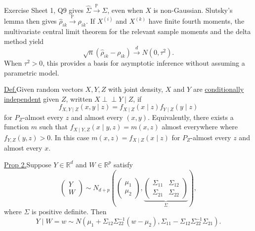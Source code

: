 \documentclass[11pt,a4paper]{article}
\begin{document}
Exercise Sheet 1, Q9 gives $\hat\Sigma\xrightarrow{\mathbb P}\Sigma$,
even when $X$ is non-Gaussian. Slutsky's lemma then gives
$\hat\rho_{ik}\xrightarrow{\mathbb P}\rho_{ik}$.
If $X^{(i)}$ and $X^{(k)}$ have finite fourth moments, the multivariate
central limit theorem for the relevant sample moments and the delta
method yield
\[
\sqrt n(\hat\rho_{ik}-\rho_{ik})\xrightarrow{d}N(0,\tau^2).
\]
When $\tau^2>0$, this provides a basis for asymptotic inference without
assuming a parametric model.

\medskip
\noindent\underline{Def.}\quad Given random vectors $X,Y,Z$ with
joint density, $X$ and $Y$ are \underline{conditionally independent}
given $Z$, written $X\perp\!\!\!\perp Y\mid Z$, if
\[
f_{X,Y\mid Z}(x,y\mid z)=f_{X\mid Z}(x\mid z)f_{Y\mid Z}(y\mid z)
\]
for $P_Z$-almost every $z$ and almost every $(x,y)$.
Equivalently, there exists a function $m$ such that
$f_{X\mid Y,Z}(x\mid y,z)=m(x,z)$ almost everywhere where
$f_{Y,Z}(y,z)>0$. In this case $m(x,z)=f_{X\mid Z}(x\mid z)$ for
$P_Z$-almost every $z$ and almost every $x$.

\medskip
\noindent\underline{Prop 2.}\quad Suppose $Y\in\mathbb R^d$ and
$W\in\mathbb R^p$ satisfy
\[
\begin{pmatrix}Y\\ W\end{pmatrix}
\sim N_{d+p}\!\left(
\begin{pmatrix}\mu_1\\ \mu_2\end{pmatrix},
\underbrace{\begin{pmatrix}
\Sigma_{11}&\Sigma_{12}\\
\Sigma_{21}&\Sigma_{22}
\end{pmatrix}}_{\Sigma}
\right),
\]
where $\Sigma$ is positive definite. Then
\[
Y\mid W=w\sim N\!\left(
\mu_1+\Sigma_{12}\Sigma_{22}^{-1}(w-\mu_2),
\Sigma_{11}-\Sigma_{12}\Sigma_{22}^{-1}\Sigma_{21}
\right).
\]
\end{document}

